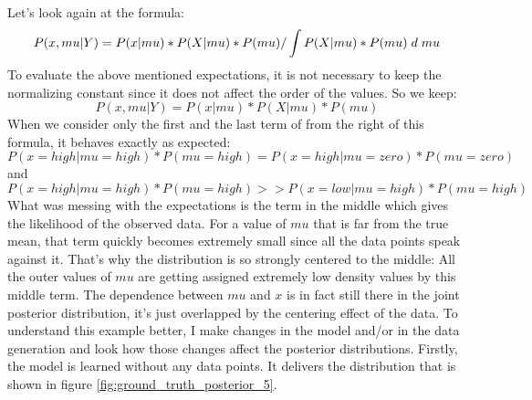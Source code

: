 \documentclass{article}
\begin{document}
Let's look again at the formula:
\begin{equation}
P(x,mu|Y) = P(x|mu) * P(X|mu) * P(mu) / \int P(X|mu) * P(mu) \hspace{1mm} d \hspace{1mm} mu
\end{equation}
To evaluate the above mentioned expectations, it is not necessary to keep the normalizing constant since it does not affect the order of the values. So we keep:
\begin{equation}
P(x,mu|Y) = P(x|mu) * P(X|mu) * P(mu)
\end{equation}
When we consider only the first and the last term of from the right of this formula, it behaves exactly as expected: \begin{equation}
P(x=high|mu=high)*P(mu=high) = P(x=high|mu=zero)*P(mu=zero)
\end{equation}
and 
\begin{equation}
P(x=high|mu=high)*P(mu=high) >> P(x=low|mu=high)*P(mu=high)
\end{equation} What was messing with the expectations is the term in the middle which gives the likelihood of the observed data. For a value of $mu$ that is far from the true mean, that term quickly becomes extremely small since all the data points speak against it. That's why the distribution is so strongly centered to the middle: All the outer values of $mu$ are getting assigned extremely low density values by this middle term. 
The dependence between $mu$ and $x$ is in fact still there in the joint posterior distribution, it's just overlapped by the centering effect of the data. To understand this example better, I make changes in the model and/or in the data generation and look how those changes affect the posterior distributions. Firstly, the model is learned without any data points. It delivers the distribution that is shown in figure \ref{fig:ground_truth_posterior_5}.
\end{document}
